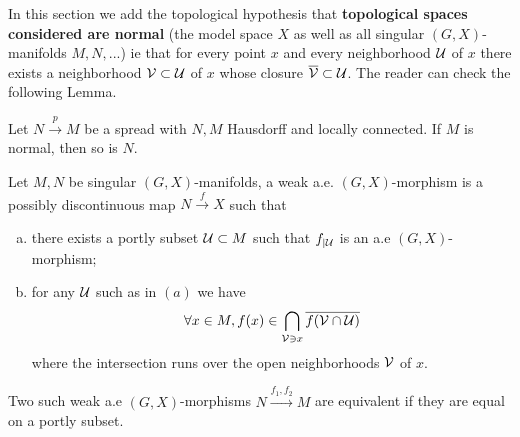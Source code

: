 In this section we add the topological hypothesis that \textbf{topological spaces considered are normal} (the model space $X$ as well as all singular $(G,X)$-manifolds $M,N,...$)  ie that for every point $x$ and every neighborhood $\mathcal{U}$ of $x$ there exists a neighborhood $\mathcal V\subset \mathcal{U}$ of $x$ whose closure $\overline {\mathcal V} \subset \mathcal{U}$.
The reader can check the following Lemma.
\begin{lem}\label{lem:spread_hausdorff_locally_connected} Let $N\xrightarrow{p}M$ be a spread with $N,M$ Hausdorff and locally connected. 
If $M$ is normal, then so is $N$.
\end{lem}


\begin{defi}\label{def:weak_morphism}
Let $M,N$ be singular $(G,X)$-manifolds, a weak a.e. $(G,X)$-morphism  is a possibly discontinuous map 
$N\xrightarrow{f} X$ such that 
\begin{enumerate}[(a)]
 \item there exists a portly subset $\mathcal{U}\subset M$ such that $f_{|\mathcal{U}}$ is an a.e $
 (G,X)$-morphism;
 \item for any $\mathcal{U}$ such as in $(a)$ we have 
 $$\forall x\in M, f(x) \in \bigcap_{\mathcal V\ni x} \overline {f(\mathcal V\cap \mathcal{U})}$$
 where the intersection runs over the open neighborhoods $\mathcal V$ of $x$. 
\end{enumerate}

Two such weak a.e $(G,X)$-morphisms $N\xrightarrow{f_1,f_2}M$ are equivalent if they are equal on a portly subset.
\end{defi}



